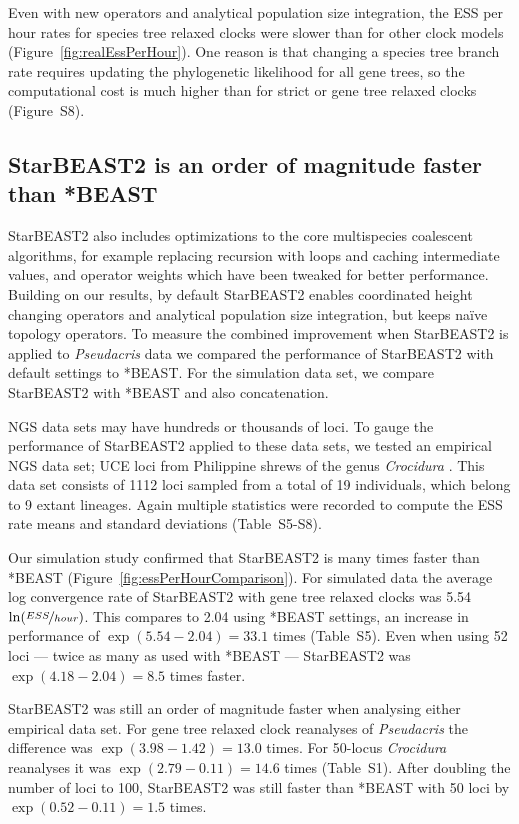 \documentclass[12pt]{article}
\begin{document}
Even with new operators and analytical population size integration, the ESS
per hour rates for species tree relaxed clocks were slower than for other
clock models (Figure~\ref{fig:realEssPerHour}). One reason is that changing a
species tree branch rate requires updating the phylogenetic likelihood for all
gene trees, so the computational cost is much higher than for strict or gene
tree relaxed clocks (Figure~S8).

\subsection{StarBEAST2 is an order of magnitude faster than *BEAST}

StarBEAST2 also includes optimizations to the core multispecies coalescent
algorithms, for example replacing recursion with loops and caching
intermediate values, and operator weights which have been tweaked for better
performance. Building on our results, by default StarBEAST2 enables
coordinated height changing operators and analytical population size
integration, but keeps na\"ive topology operators. To measure the combined
improvement when StarBEAST2 is applied to \textit{Pseudacris} data we compared
the performance of StarBEAST2 with default settings to *BEAST. For the
simulation data set, we compare StarBEAST2 with *BEAST and also concatenation.

NGS data sets may have hundreds or thousands of loci. To gauge the performance
of StarBEAST2 applied to these data sets, we tested an empirical NGS data set;
UCE loci from Philippine shrews of the genus \textit{Crocidura}
\citep{Giarla01092015}. This data set consists of 1112 loci sampled from a
total of 19 individuals, which belong to 9 extant lineages. Again multiple
statistics were recorded to compute the ESS rate means and standard deviations
(Table~S5-S8).

Our simulation study confirmed that StarBEAST2 is many times faster than
*BEAST (Figure~\ref{fig:essPerHourComparison}). For simulated data the average
log convergence rate of StarBEAST2 with gene tree relaxed clocks was 5.54
$\ln(\nicefrac{ESS}{hour})$. This compares to 2.04 using *BEAST settings, an
increase in performance of $\exp(5.54 - 2.04) = 33.1$ times (Table~S5). Even
when using 52 loci --- twice as many as used with *BEAST --- StarBEAST2 was
$\exp(4.18 - 2.04) = 8.5$ times faster.

StarBEAST2 was still an order of magnitude faster when analysing either
empirical data set. For gene tree relaxed clock reanalyses of
\textit{Pseudacris} the difference was $\exp(3.98 - 1.42) = 13.0$ times. For
50-locus \textit{Crocidura} reanalyses it was $\exp(2.79 - 0.11) = 14.6$ times
(Table~S1). After doubling the number of loci to 100, StarBEAST2 was still
faster than *BEAST with 50 loci by $\exp(0.52 - 0.11) = 1.5$ times.
\end{document}
